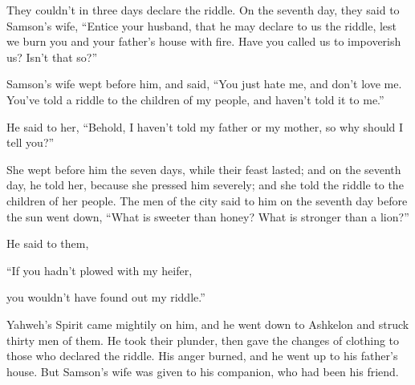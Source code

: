 {\par }{\PP They couldn’t in three days declare the riddle.
On the seventh day, they said to Samson’s wife, “Entice your husband, that he may declare to us the riddle, lest we burn you and your father’s house with fire. Have you called us to impoverish us? Isn’t that so?”
\par }{\PP {}Samson’s wife wept before him, and said, “You just hate me, and don’t love me. You’ve told a riddle to the children of my people, and haven’t told it to me.”
\par }{\PP He said to her, “Behold, I haven’t told my father or my mother, so why should I tell you?”
\par }{\PP {}She wept before him the seven days, while their feast lasted; and on the seventh day, he told her, because she pressed him severely; and she told the riddle to the children of her people.
The men of the city said to him on the seventh day before the sun went down, “What is sweeter than honey? What is stronger than a lion?”
\par }{\PP He said to them,
\par }{\Q “If you hadn’t plowed with my heifer,
\par }{\QB you wouldn’t have found out my riddle.”
\par }{\PP {}Yahweh’s Spirit came mightily on him, and he went down to Ashkelon and struck thirty men of them. He took their plunder, then gave the changes of clothing to those who declared the riddle. His anger burned, and he went up to his father’s house.
But Samson’s wife was given to his companion, who had been his friend.

}
